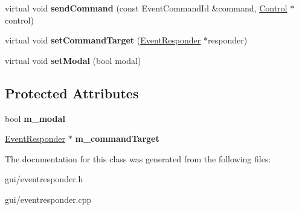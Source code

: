 \begin{DoxyCompactItemize}
\item 
virtual void {\bfseries send\+Command} (const Event\+Command\+Id \&command, \hyperlink{classControl}{Control} $\ast$control)\hypertarget{classEventResponder_a60bd5ddf50537193dd62e87cd89501f7}{}\label{classEventResponder_a60bd5ddf50537193dd62e87cd89501f7}

\item 
virtual void {\bfseries set\+Command\+Target} (\hyperlink{classEventResponder}{Event\+Responder} $\ast$responder)\hypertarget{classEventResponder_af646a872cede20dcc5fbbc61dd0a722a}{}\label{classEventResponder_af646a872cede20dcc5fbbc61dd0a722a}

\item 
virtual void {\bfseries set\+Modal} (bool modal)\hypertarget{classEventResponder_a1d702b9eb291481aaac1370162633d60}{}\label{classEventResponder_a1d702b9eb291481aaac1370162633d60}

\end{DoxyCompactItemize}
\subsection*{Protected Attributes}
\begin{DoxyCompactItemize}
\item 
bool {\bfseries m\+\_\+modal}\hypertarget{classEventResponder_a7bce5b9ab602d3d7edb3a71d89b924f6}{}\label{classEventResponder_a7bce5b9ab602d3d7edb3a71d89b924f6}

\item 
\hyperlink{classEventResponder}{Event\+Responder} $\ast$ {\bfseries m\+\_\+command\+Target}\hypertarget{classEventResponder_a5cdaf677fe2dafaab9513ab1d68f6267}{}\label{classEventResponder_a5cdaf677fe2dafaab9513ab1d68f6267}

\end{DoxyCompactItemize}


The documentation for this class was generated from the following files\+:\begin{DoxyCompactItemize}
\item 
gui/eventresponder.\+h\item 
gui/eventresponder.\+cpp\end{DoxyCompactItemize}
